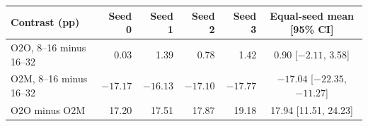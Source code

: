 \begin{tabular}{@{}lrrrrc@{}}
\toprule
Contrast (pp) & Seed 0 & Seed 1 & Seed 2 & Seed 3 & Equal-seed mean [95\% CI] \\
\midrule
O2O, 8--16 minus 16--32 & 0.03 & 1.39 & 0.78 & 1.42 & 0.90 [$-2.11$, 3.58] \\
O2M, 8--16 minus 16--32 & $-17.17$ & $-16.13$ & $-17.10$ & $-17.77$ & $-17.04$ [$-22.35$, $-11.27$] \\
O2O minus O2M & 17.20 & 17.51 & 17.87 & 19.18 & 17.94 [11.51, 24.23] \\
\bottomrule
\end{tabular}
